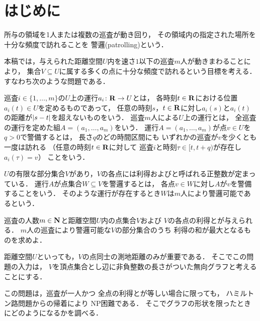 \section{はじめに}
所与の領域を1人または複数の巡査が動き回り，
その領域内の指定された場所を十分な頻度で訪れることを
警邏(patrolling)という\cite{chen2013fence, coene2011charlemagne, czyzowicz2011boundary}．

本稿では，与えられた距離空間$U$内を速さ$1$以下の巡査$m$人が動きまわることにより，
集合$V \subseteq U$に属する多くの点に十分な頻度で訪れるという目標を考える．
すなわち次のような問題である．

巡査$i \in \{1, \ldots, m\}$の$U$上の運行$a _i \colon \mathbf R \to U$とは，
各時刻$t \in \mathbf R$における位置$a _i (t) \in U$を定めるものであって，
任意の時刻$s$，$t \in \mathbf R$に対し$a _i (s)$と$a _i (t)$の距離が$\lvert{s - t}\rvert$を超えないものをいう．
巡査$m$人による$U$上の運行とは，
全巡査の運行を定めた組$A = (a _1, \dots, a _m)$をいう．
運行$A = (a _1, \dots, a _m)$が点$v \in U$を{\idletime}$q > 0$で警備するとは，
長さ$q$のどの時間区間にも
いずれかの巡査が$v$を少くとも一度は訪れる
（任意の時刻$t \in \mathbf R$に対して
巡査$i$と時刻$\tau \in [t, t + q)$が存在し$a _i (\tau) = v$）
ことをいう．

$U$の有限な部分集合$V$があり，$V$の各点には利得および{\idletime}と呼ばれる正整数が定まっている．
運行$A$が点集合$W \subseteq V$を警邏するとは，
各点$v \in W$に対し$A$が$v$を警備することをいう．
そのような運行が存在するとき$W$は$m$人により警邏可能であるという．

\begin{patrollingProblem}
巡査の人数$m \in \mathbf N$と距離空間$U$内の点集合$V$および
$V$の各点の利得と{\idletime}が与えられる．
$m$人の巡査により警邏可能な$V$の部分集合のうち
利得の和が最大となるものを求めよ．
\end{patrollingProblem}

距離空間$U$といっても，$V$の点同士の測地距離のみが重要である．
そこでこの問題の入力は，
$V$を頂点集合とし辺に非負整数の長さがついた無向グラフと考えることにする．

この問題は，巡査が一人かつ
全点の利得と{\idletime}が等しい場合に限っても，
ハミルトン路問題からの帰着により
NP困難である\cite[Theorem~8]{coene2011charlemagne}．
そこでグラフの形状を限ったときにどのようになるかを調べる．

